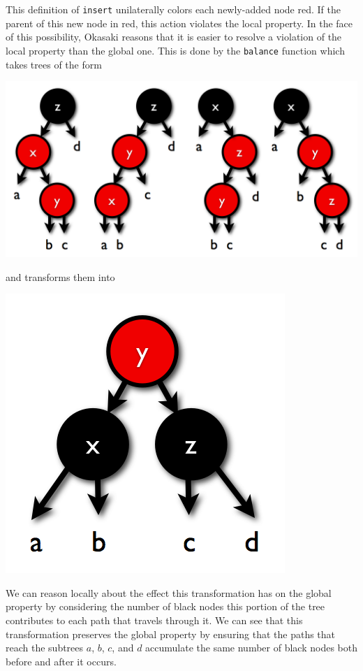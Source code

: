\documentclass[preprint]{sigplanconf}
\begin{document}
This definition of \texttt{insert} unilaterally colors each newly-added node red. If the parent of this new node in red, this action violates the local property. In the face of this possibility, Okasaki reasons that it is easier to resolve a violation of the local property than the global one. This is done by the \texttt{balance} function which takes trees of the form
\begin{center}
\includegraphics[scale=0.22]{four-cases.png}
\end{center}
and transforms them into
\begin{center}
\includegraphics[scale=0.22]{four-cases-resolved.png}
\end{center}

We can reason locally about the effect this transformation has on the global property by considering the number of black nodes this portion of the tree contributes to each path that travels through it. We can see that this transformation preserves the global property by ensuring that the paths that reach the subtrees $a$, $b$, $c$, and $d$ accumulate the same number of black nodes both before and after it occurs.
\end{document}
